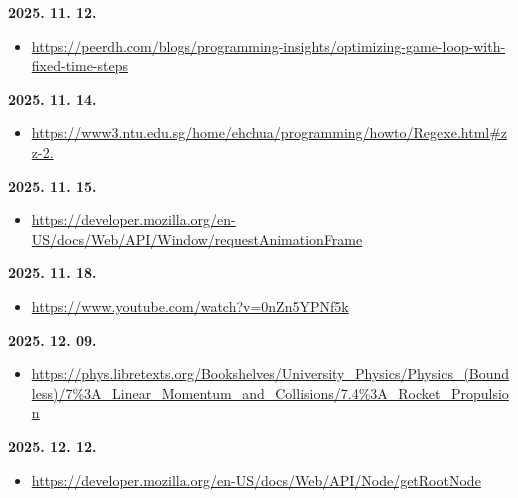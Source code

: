 \documentclass[12pt]{report}
\begin{document}
\noindent\textbf{2025. 11. 12.}
\begin{itemize}[left=0pt, topsep=0pt]
    \item \url{https://peerdh.com/blogs/programming-insights/optimizing-game-loop-with-fixed-time-steps}
\end{itemize}

\noindent\textbf{2025. 11. 14.}
\begin{itemize}[left=0pt, topsep=0pt]
    \item \url{https://www3.ntu.edu.sg/home/ehchua/programming/howto/Regexe.html#zz-2.}
\end{itemize}

\noindent\textbf{2025. 11. 15.}
\begin{itemize}[left=0pt, topsep=0pt]
    \item \url{https://developer.mozilla.org/en-US/docs/Web/API/Window/requestAnimationFrame}
\end{itemize}

\noindent\textbf{2025. 11. 18.}
\begin{itemize}[left=0pt, topsep=0pt]
    \item \url{https://www.youtube.com/watch?v=0nZn5YPNf5k}
\end{itemize}

\noindent\textbf{2025. 12. 09.}
\begin{itemize}[left=0pt, topsep=0pt]
    \item \url{https://phys.libretexts.org/Bookshelves/University_Physics/Physics_(Boundless)/7%3A_Linear_Momentum_and_Collisions/7.4%3A_Rocket_Propulsion}
\end{itemize}

\noindent\textbf{2025. 12. 12.}
\begin{itemize}[left=0pt, topsep=0pt]
    \item \url{https://developer.mozilla.org/en-US/docs/Web/API/Node/getRootNode}
\end{itemize}
\end{document}
